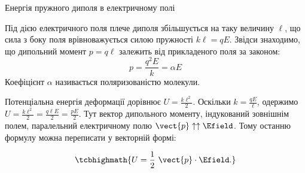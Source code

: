 \documentclass{beamer}
\begin{document}
\begin{frame}{Енергія пружного диполя в електричному полі}{}
	\begin{block}{}\small\justifying
		Під дією електричного поля плече диполя збільшується на таку величину $\ell$, що сила з боку
		поля врівноважується силою пружності
		$
			k\ell = qE
		$.
		Звідси знаходимо, що дипольний момент $p = q\ell$ залежить від прикладеного поля за законом:
		\begin{equation*}
			p = \frac{q^2E}{k} = \alpha E
		\end{equation*}
		Коефіцієнт $\alpha$ називається \alert{поляризованістю молекули}.

		\smallskip

		Потенціальна енергія деформації дорівнює
		$
			U = \frac{k\ell^2}2
		$.
		Оскільки $k = \frac{qE}{\ell}$, одержимо
		$
			U = \frac{k\ell^2}2 = \frac{q\ell E}2 = \frac{pE}2
		$.
		Тут вектор дипольного моменту, індукований зовнішнім полем, паралельний електричному полю
		$\vect{p}\uparrow\uparrow \Efield$. Тому останню формулу можна переписати у векторній формі:
	\end{block}
	\begin{equation*}
		\tcbhighmath{
			U = \frac12\ \vect{p}\cdot\Efield.
		}
	\end{equation*}
\end{frame}
\end{document}
